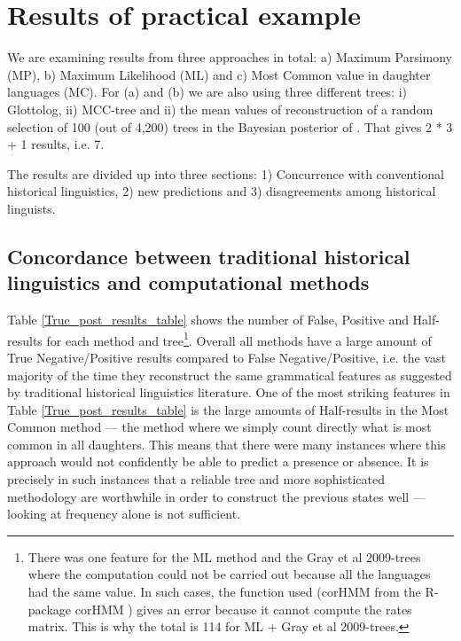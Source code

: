 \documentclass[12pt,letterpaper]{article}
\begin{document}
\FloatBarrier
\section{Results of practical example}
We are examining results from three approaches in total: a) Maximum Parsimony (MP), b) Maximum Likelihood (ML) and c) Most Common value in daughter languages (MC). For (a) and (b) we are also using three different trees: i) Glottolog, ii) \citet{grayetal_2009} MCC-tree and ii) the mean values of reconstruction of a random selection of 100 (out of 4,200) trees in the Bayesian posterior of \citet{grayetal_2009}. That gives 2 * 3 + 1 results, i.e. 7.

The results are divided up into three sections: 1) Concurrence with conventional historical linguistics, 2) new predictions and 3) disagreements among historical linguists.

\subsection{Concordance between traditional historical linguistics and computational methods}
\label{sec:results_concorance}




Table \ref{True_post_results_table} shows the number of False, Positive and Half-results for each method and tree\footnote{There was one feature for the ML method and the Gray et al 2009-trees where the computation could not be carried out because all the languages had the same value. In such cases, the function used (corHMM from the R-package corHMM \citep{R-corHMM}) gives an error because it cannot compute the rates matrix. This is why the total is 114 for ML + Gray et al 2009-trees.}. Overall all methods have a large amount of True Negative/Positive results compared to False Negative/Positive, i.e. the vast majority of the time they reconstruct the same grammatical features as suggested by traditional historical linguistics literature. One of the most striking features in Table \ref{True_post_results_table} is the large amounts of Half-results in the Most Common method --- the method where we simply count directly what is most common in all daughters. This means that there were many instances where this approach would not confidently be able to predict a presence or absence. It is precisely in such instances that a reliable tree and more sophisticated methodology are worthwhile in order to construct the previous states well --- looking at frequency alone is not sufficient.
\end{document}
